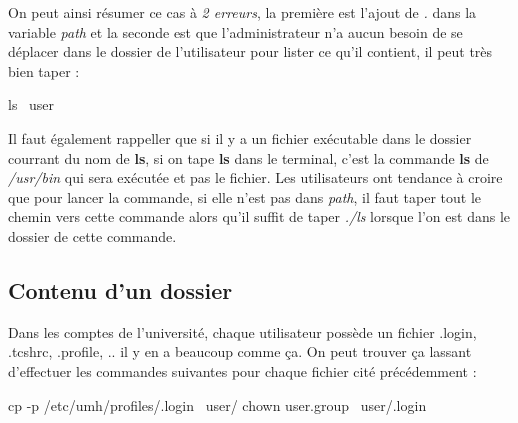 \documentclass{article}
\newcommand{\titre}[1]{\textcolor{title}{#1}}
\newcommand{\tssect}[1]{\titre{\subsection{#1}}}
\newcommand{\term}[1]{\textit{\textcolor{maintitle}{#1}}}
\begin{document}
\begin{sffamily}

On peut ainsi résumer ce cas à \term{2 erreurs}, la première est l'ajout de \term{.} dans la variable \term{path} et la 
seconde est que l'administrateur n'a aucun besoin de se déplacer dans le dossier de l'utilisateur pour lister ce qu'il 
contient, il peut très bien taper :
\begin{center}
	\begin{boxedverbatim}
	ls ~user
	\end{boxedverbatim}
\end{center}

Il faut également rappeller que si il y a un fichier exécutable dans le dossier courrant du nom de \textbf{ls}, si on 
tape \textbf{ls} dans le terminal, c'est la commande \textbf{ls} de \term{/usr/bin} qui sera exécutée et pas le 
fichier. Les utilisateurs ont tendance à croire que pour lancer la commande, si elle n'est pas dans \term{path}, il 
faut taper tout le chemin vers cette commande alors qu'il suffit de taper \textit{./ls} lorsque l'on est dans le 
dossier de cette commande.

\tssect{Contenu d'un dossier}

Dans les comptes de l'université, chaque utilisateur possède un fichier .login, .tcshrc, .profile, .. il y en a 
beaucoup comme ça. On peut trouver ça lassant d'effectuer les commandes suivantes pour chaque fichier cité précédemment 
:
\begin{center}
	\begin{boxedverbatim}
	cp -p /etc/umh/profiles/.login ~user/
	chown user.group ~user/.login
	\end{boxedverbatim}
\end{center}


\end{sffamily}
\end{document}
